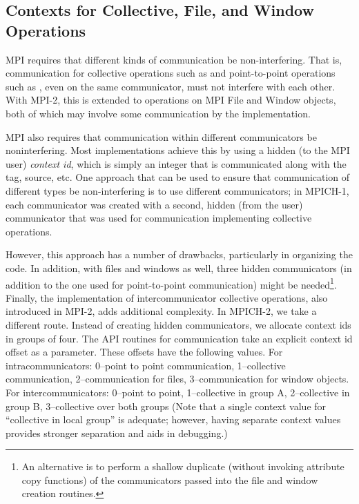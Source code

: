 \subsection{Contexts for Collective, File, and Window Operations}
\label{sec:comm-for-coll}
MPI requires that different kinds of communication be
non-interfering.  That is, communication for collective operations
such as  and point-to-point operations such as
, even on the same communicator, must not interfere
with each other.  With MPI-2, this is extended to operations on MPI
File and Window objects, both of which may involve some communication
by the implementation.

MPI also requires that communication within different
communicators be noninterfering.  Most implementations achieve this by
using a hidden (to the MPI user) \emph{context id},
which is simply an 
integer that is communicated along with the tag, source, etc.  
One approach that can be used to ensure that
communication of different types be non-interfering is to use
different communicators; in MPICH-1, each communicator was created
with a second, hidden (from the user) communicator that was used for
communication implementing collective operations.  

However, this approach has a number of drawbacks, particularly in
organizing the code.  In addition, with files and windows as well,
three hidden communicators (in addition to the one used for point-to-point
communication) might be needed\footnote{An alternative is
to perform a shallow duplicate (without invoking attribute copy
functions) of the communicators passed into the file and window
creation routines.}.  Finally, the implementation of intercommunicator
collective operations, also introduced in MPI-2, adds additional
complexity.  In MPICH-2, we take a different route.  Instead of
creating hidden communicators, we allocate context ids in groups of
four.  The API routines for communication take an explicit context id
offset as a parameter.  These offsets have the following values.  For
intracommunicators: 0--point to point communication, 1--collective
communication, 2--communication for files, 3--communication for window
objects.  For intercommunicators: 0--point to point, 1--collective in
group A, 2--collective in group B, 3--collective over both groups
(Note that a single context value for ``collective in local group'' is
adequate; however, having separate context values provides stronger
separation and aids in debugging.)
%

